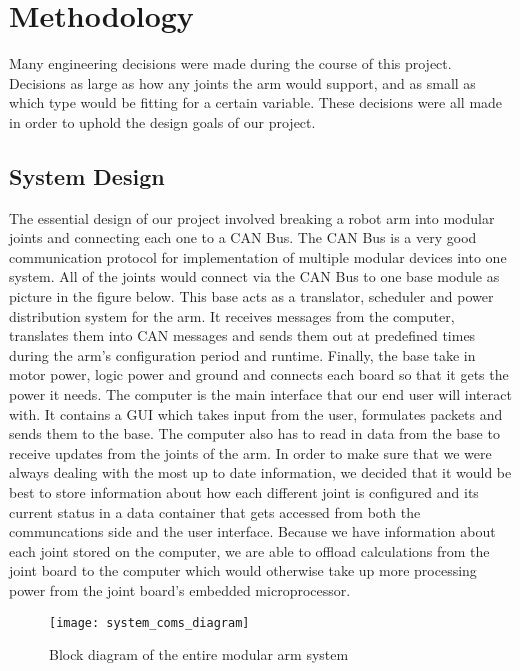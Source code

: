 \section{Methodology}
Many engineering decisions were made during the course of this project. Decisions as large as how any joints the arm would support, and as small as which type would be fitting for a certain variable. These decisions were all made in order to uphold the design goals of our project. 

\subsection{System Design}
The essential design of our project involved breaking a robot arm into modular joints and connecting each one to a CAN Bus. The CAN Bus is a very good communication protocol for implementation of multiple modular devices into one system. All of the joints would connect via the CAN Bus to one base module as picture in the figure below. This base acts as a translator, scheduler and power distribution system for the arm. It receives messages from the computer, translates them into CAN messages and sends them out at predefined times during the arm's configuration period and runtime. Finally, the base take in motor power, logic power and ground and connects each board so that it gets the power it needs. The computer is the main interface that our end user will interact with. It contains a GUI which takes input from the user, formulates packets and sends them to the base. The computer also has to read in data from the base to receive updates from the joints of the arm. In order to make sure that we were always dealing with the most up to date information, we decided that it would be best to store information about how each different joint is configured and its current status in a data container that gets accessed from both the communcations side and the user interface. Because we have information about each joint stored on the computer, we are able to offload calculations from the joint board to the computer which would otherwise take up more processing power from the joint board's embedded microprocessor.
\begin{figure}[H]
	\centering
	\texttt{[image: system\_coms\_diagram]}
	\caption{Block diagram of the entire modular arm system}
	\label{fig:system_block_diagram}
\end{figure}



